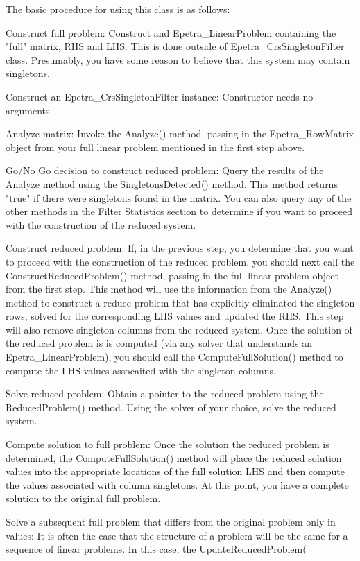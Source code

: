 The basic procedure for using this class is as follows:
\begin{EpetraItemize}
\item Construct full problem: 
      Construct and Epetra\_LinearProblem containing the "full" matrix, RHS and LHS.  
      This is done outside of Epetra\_CrsSingletonFilter class.  Presumably, you have 
      some reason to believe that this system may contain singletons.
\item Construct an Epetra\_CrsSingletonFilter instance:  Constructor needs no arguments.
\item Analyze matrix: 
      Invoke the Analyze() method, passing in the Epetra\_RowMatrix object from your full 
      linear problem mentioned in the first step above.
\item Go/No Go decision to construct reduced problem: 
      Query the results of the Analyze method using the SingletonsDetected() method.  
      This method returns "true" if there were singletons found in the matrix.  You can 
      also query any of the other methods
      in the Filter Statistics section to determine if you want to proceed with the
      construction of the reduced system.
\item Construct reduced problem: 
     If, in the previous step, you determine that you want to proceed with the
     construction of the reduced problem, you should next call the 
     ConstructReducedProblem() method, passing in the full linear problem object from the first
     step.  This method will use the information from the Analyze() method to construct a
     reduce problem that has
     explicitly eliminated the singleton rows, solved for the corresponding LHS values and
     updated the RHS.  This 
     step will also remove singleton columns from the reduced system.  Once the solution
     of the reduced problem is
     is computed (via any solver that understands an Epetra\_LinearProblem), you should
     call the ComputeFullSolution()
     method to compute the LHS values assocaited with the singleton columns.
\item Solve reduced problem: 
     Obtain a pointer to the reduced problem using the
     ReducedProblem() method.  Using the solver of your choice, solve the reduced system.
\item Compute solution to full problem:  
     Once the solution the reduced problem is
     determined, the ComputeFullSolution()
     method will place the reduced solution values into the appropriate locations of the
     full solution LHS and then
     compute the values associated with column singletons.  At this point, you have a
     complete solution to the original
     full problem.
\item Solve a subsequent full problem that differs from the original problem only in
values: It is often the case that the
     structure of a problem will be the same for a sequence of linear problems.  In this
     case, the UpdateReducedProblem(

\end{EpetraItemize}
